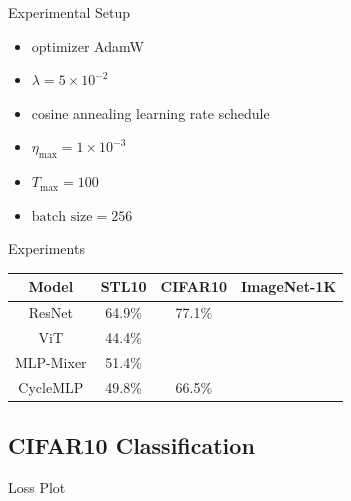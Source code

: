 \documentclass{beamer}
\begin{document}
\begin{frame}{Experimental Setup}
    \begin{itemize}
        \item optimizer AdamW
        \item $\lambda = 5 \times 10^{-2}$
        \item cosine annealing learning rate schedule
        \item $\eta_{\text{max}} = 1 \times 10^{-3}$
        \item $T_\text{max} = 100$
        \item $\text{batch size} = 256$
    \end{itemize}
\end{frame}

\begin{frame}{Experiments}
    \centering
    \begin{tabular}{c c c c}
        \hline
        Model & STL10 & CIFAR10 & ImageNet-1K \\
        \hline
        ResNet & 64.9\% & 77.1\% \\
        ViT & 44.4\% \\
        MLP-Mixer & 51.4\% \\
        CycleMLP & 49.8\% & 66.5\% \\
        \hline
    \end{tabular}
\end{frame}

\subsection{CIFAR10 Classification}

\begin{frame}{Loss Plot}
    \centering
\end{frame}
\end{document}
